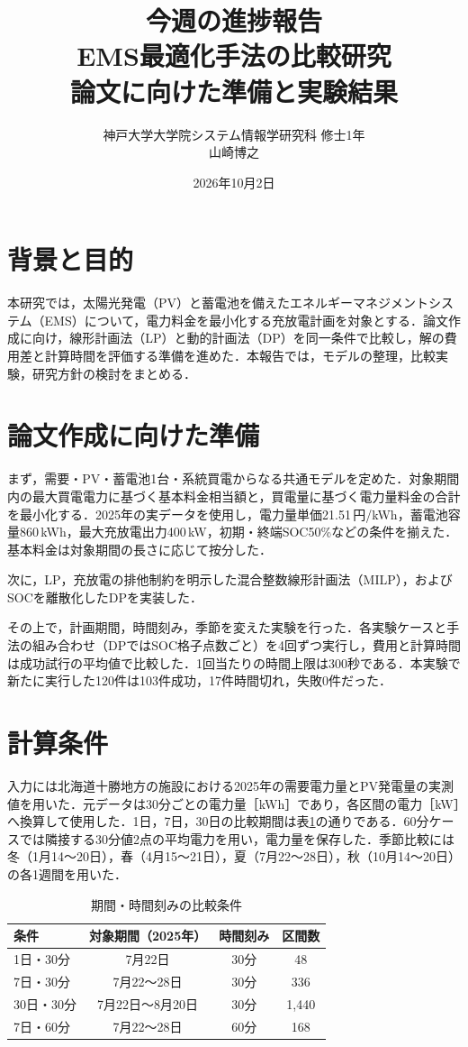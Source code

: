 \documentclass[a4paper,11pt,xelatex,ja=standard]{bxjsarticle}
\title{今週の進捗報告\\[0.5em]\large EMS最適化手法の比較研究\\論文に向けた準備と実験結果}
\author{神戸大学大学院システム情報学研究科 修士1年\\山崎博之}
\date{2026年10月2日}
\begin{document}
\maketitle

\section{背景と目的}
本研究では，太陽光発電（PV）と蓄電池を備えたエネルギーマネジメントシステム（EMS）について，電力料金を最小化する充放電計画を対象とする．論文作成に向け，線形計画法（LP）と動的計画法（DP）を同一条件で比較し，解の費用差と計算時間を評価する準備を進めた．本報告では，モデルの整理，比較実験，研究方針の検討をまとめる．

\section{論文作成に向けた準備}
まず，需要・PV・蓄電池1台・系統買電からなる共通モデルを定めた．対象期間内の最大買電電力に基づく基本料金相当額と，買電量に基づく電力量料金の合計を最小化する．2025年の実データを使用し，電力量単価21.51\,円/kWh，蓄電池容量860\,kWh，最大充放電出力400\,kW，初期・終端SOC50\%などの条件を揃えた．基本料金は対象期間の長さに応じて按分した．

次に，LP，充放電の排他制約を明示した混合整数線形計画法（MILP），およびSOCを離散化したDPを実装した．

その上で，計画期間，時間刻み，季節を変えた実験を行った．各実験ケースと手法の組み合わせ（DPではSOC格子点数ごと）を4回ずつ実行し，費用と計算時間は成功試行の平均値で比較した．1回当たりの時間上限は300秒である．本実験で新たに実行した120件は103件成功，17件時間切れ，失敗0件だった．

\section{計算条件}
入力には北海道十勝地方の施設における2025年の需要電力量とPV発電量の実測値を用いた．元データは30分ごとの電力量［kWh］であり，各区間の電力［kW］へ換算して使用した．1日，7日，30日の比較期間は表\ref{tab:conditions}の通りである．60分ケースでは隣接する30分値2点の平均電力を用い，電力量を保存した．季節比較には冬（1月14～20日），春（4月15～21日），夏（7月22～28日），秋（10月14～20日）の各1週間を用いた．

\begin{table}[htbp]
    \centering
    \caption{期間・時間刻みの比較条件}
    \label{tab:conditions}
    \begin{tabular}{lccc}
        \toprule
        条件      & 対象期間（2025年） & 時間刻み & 区間数   \\
        \midrule
        1日・30分  & 7月22日       & 30分  & 48    \\
        7日・30分  & 7月22～28日    & 30分  & 336   \\
        30日・30分 & 7月22日～8月20日 & 30分  & 1,440 \\
        7日・60分  & 7月22～28日    & 60分  & 168   \\
        \bottomrule
    \end{tabular}
\end{table}
\end{document}
